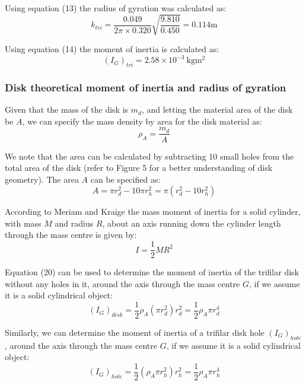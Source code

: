 \documentclass[a4paper]{article}
\begin{document}
Using equation (13) the radius of gyration was calculated as:
\begin{equation}
k_{tri} = \frac{0.049}{2 \pi \times 0.320}\sqrt{\frac{9.810}{0.450}} = 0.114\si{\meter}
\end{equation}

Using equation (14) the moment of inertia is calculated as:
\begin{equation}
(I_G)_{tri} = 2.58 \times 10^{-3} \ \si{\kilogram\meter^2}
\end{equation}

\subsubsection{Disk theoretical moment of inertia and radius of gyration}
Given that the mass of the disk is $m_d$, and letting the material area of the disk be $A$, we can specify the mass density by area for the disk material as:
\begin{equation}
	\rho_A = \frac{m_d}{A}
\end{equation}

We note that the area can be calculated by subtracting 10 small holes from the total area of the disk (refer to Figure 5 for a better understanding of disk geometry). The area $A$ can be specified as:
\begin{equation}
	A = \pi r_d^2 - 10 \pi r_h^2 = \pi (r_d^2 - 10 r_h^2)
\end{equation}

According to Meriam and Kraige the mass moment of inertia for a solid cylinder, with mass $M$ and radius $R$, about an axis running down the cylinder length through the mass centre is given by:
\begin{equation}
I = \frac{1}{2}MR^2
\end{equation}

Equation (20) can be used to determine the moment of inertia of the trifilar disk without any holes in it, around the axis through the mass centre $G$, if we assume it is a solid cylindrical object:
\begin{equation}
(I_G)_{disk} = \frac{1}{2} \rho_A (\pi r_d^2) r_d^2 = \frac{1}{2} \rho_A \pi r_d^4
\end{equation}

Similarly, we can determine the moment of inertia of a trifilar disk hole $(I_G)_{hole}$, around the axis through the mass centre $G$, if we assume it is a solid cylindrical object:
\begin{equation}
(I_G)_{hole} = \frac{1}{2} (\rho_A \pi r_h^2) r_h^2 = \frac{1}{2} \rho_A \pi r_h^4
\end{equation}
\end{document}
